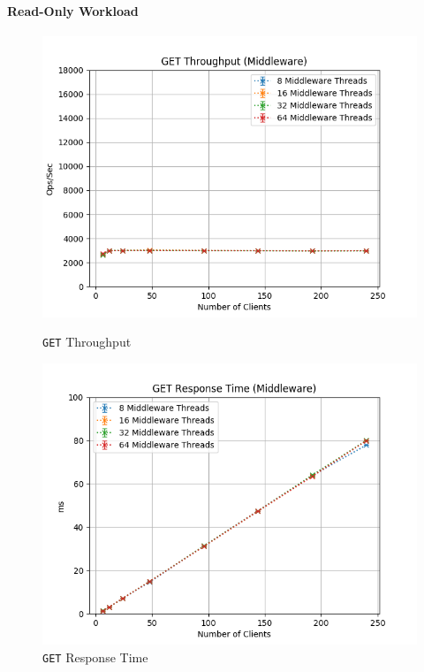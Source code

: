 \documentclass[11pt,a4paper]{article}
\begin{document}
\paragraph{Read-Only Workload}
%
\begin{figure}[H]
	\centering
	\captionsetup{width=0.4\textwidth}
    \begin{minipage}{0.5\textwidth}
        \centering
        \includegraphics[width=\textwidth]{../illustrations/plots/2_1_one_middleware/0-1/middleware_get_tp_s.png}
        \caption{\texttt{GET} Throughput}
        \label{fig:one_middleware_get_tp_mw}
    \end{minipage}\hfill
    \begin{minipage}{0.5\textwidth}
        \centering
        \includegraphics[width=\textwidth]{../illustrations/plots/2_1_one_middleware/0-1/middleware_get_rt_ms.png}
        \caption{\texttt{GET} Response Time}
        \label{fig:one_middleware_get_rt_mw}
    \end{minipage}
\end{figure}
\end{document}
